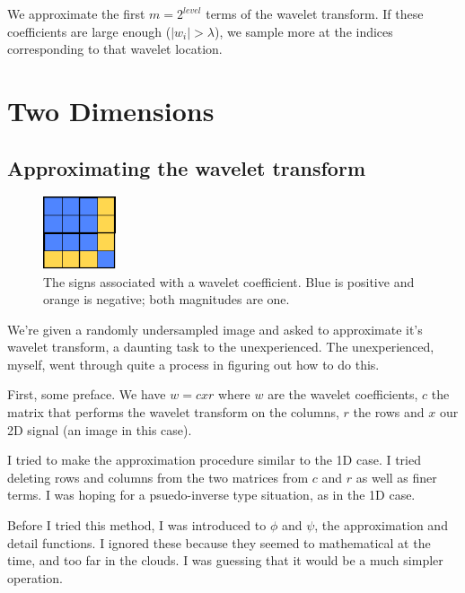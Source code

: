 \documentclass[leqno]{article}
\begin{document}
        We approximate the first $m=2^{level}$ terms of the wavelet transform. If these coefficients are large enough ($|w_i|> \lambda$), we sample more at the indices corresponding to that wavelet location.


    \section{Two Dimensions}
        \subsection{Approximating the wavelet transform}
            \begin{figure}
                \begin{center}
                    \includegraphics[width=0.19\textwidth]{signs}
                \end{center}
                \caption{The signs associated with a wavelet coefficient. Blue is positive and orange is negative; both magnitudes are one.  }
                \label{fig:signs}    
            \end{figure}

            We're given a randomly undersampled image and asked to approximate it's wavelet transform, a daunting task to the unexperienced. The unexperienced, myself, went through quite a process in figuring out how to do this. 

            First, some preface. We have $w = c x r$ where $w$ are the wavelet coefficients, $c$ the matrix that performs the wavelet transform on the columns, $r$ the rows and $x$ our 2D signal (an image in this case).

            I tried to make the approximation procedure similar to the 1D case. I tried deleting rows and columns from the two matrices from $c$ and $r$ as well as finer terms. I was hoping for a psuedo-inverse type situation, as in the 1D case.

            Before I tried this method, I was introduced to $\phi$ and $\psi$, the approximation and detail functions. I ignored these because they seemed to mathematical at the time, and too far in the clouds. I was guessing that it would be a much simpler operation.
\end{document}
